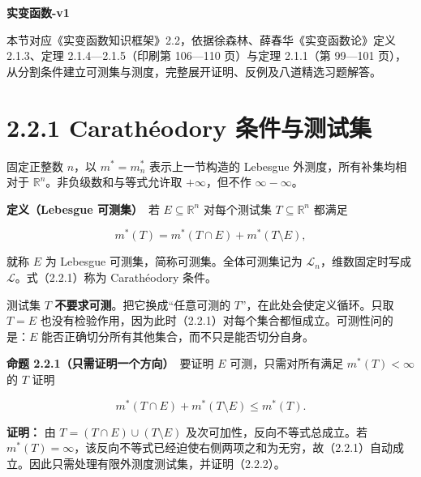\documentclass[11pt,a4paper]{article}
\begin{document}
\begin{center}
{\Large\bfseries 实变函数-v1\par}
\vspace{7pt}{\large 2.2 可测集\par}
\vspace{5pt}{第二章 Lebesgue 测度\par}
\end{center}
本节对应《实变函数知识框架》2.2，依据徐森林、薛春华《实变函数论》定义 2.1.3、定理 2.1.4—2.1.5（印刷第 106—110 页）与定理 2.1.1（第 99—101 页），从分割条件建立可测集与测度，完整展开证明、反例及八道精选习题解答。
\begingroup\setlength{\parskip}{0pt}\tableofcontents\endgroup

\section[\S{}2.2.1 Carathéodory
条件与测试集]{2.2.1 Carathéodory
条件与测试集}\label{carathuxe9odory-ux6761ux4ef6ux4e0eux6d4bux8bd5ux96c6}

固定正整数 \(n\)，以 \(m^*=m_n^*\) 表示上一节构造的 Lebesgue
外测度，所有补集均相对于 \(\mathbb R^n\)。非负级数和与等式允许取
\(+\infty\)，但不作 \(\infty-\infty\)。

\textbf{定义（Lebesgue 可测集）}　若 \(E\subseteq\mathbb R^n\)
对每个测试集 \(T\subseteq\mathbb R^n\) 都满足

\begin{equation*}
m^*(T)=m^*(T\cap E)+m^*(T\setminus E),
\tag{2.2.1}
\end{equation*}

就称 \(E\) 为 Lebesgue 可测集，简称可测集。全体可测集记为
\(\mathcal L_n\)，维数固定时写成 \(\mathcal L\)。式（2.2.1）称为
Carathéodory 条件。

测试集 \(T\) \textbf{不要求可测}。把它换成``任意可测的
\(T\)''，在此处会使定义循环。只取 \(T=E\)
也没有检验作用，因为此时（2.2.1）对每个集合都恒成立。可测性问的是：\(E\)
能否正确切分所有其他集合，而不只是能否切分自身。

\textbf{命题 2.2.1（只需证明一个方向）}　要证明 \(E\)
可测，只需对所有满足 \(m^*(T)<\infty\) 的 \(T\) 证明

\begin{equation*}
m^*(T\cap E)+m^*(T\setminus E)\le m^*(T).
\tag{2.2.2}
\end{equation*}

\textbf{证明：} 由 \(T=(T\cap E)\cup(T\setminus E)\)
及次可加性，反向不等式总成立。若
\(m^*(T)=\infty\)，该反向不等式已经迫使右侧两项之和为无穷，故（2.2.1）自动成立。因此只需处理有限外测度测试集，并证明（2.2.2）。
\end{document}
